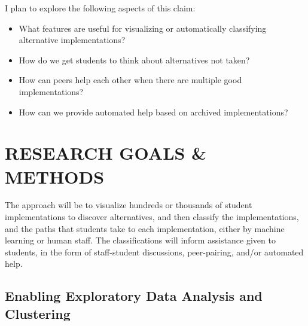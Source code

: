 \documentclass[12pt]{article}
\begin{document}
I plan to explore the following aspects of this claim:
\begin{itemize}

\item What features are useful for visualizing or automatically classifying alternative implementations?

\item How do we get students to think about alternatives not taken?

\item How can peers help each other when there are multiple good implementations?

\item How can we provide automated help based on archived implementations?

\end{itemize}


\section{RESEARCH GOALS \& METHODS}

The approach will be to visualize hundreds or thousands of student implementations to discover alternatives, and then classify the implementations, and the paths that students take to each implementation, either by machine learning or human staff. The classifications will inform assistance given to students, in the form of staff-student discussions, peer-pairing, and/or automated help.

\subsection{Enabling Exploratory Data Analysis and Clustering}
\end{document}
